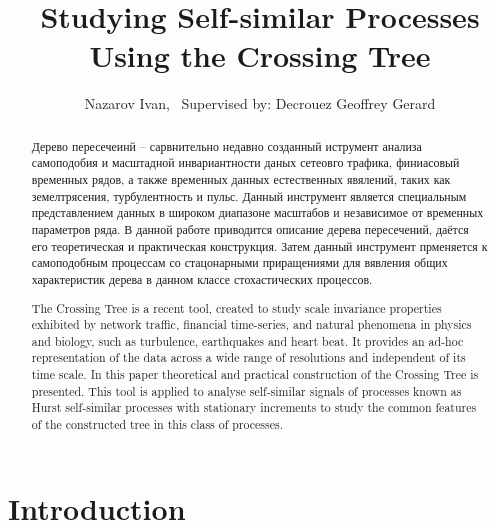 \documentclass[a4paper,14pt]{extreport}
\title{Studying Self-similar Processes Using the Crossing Tree}
\author{Nazarov Ivan, \rus{101мНОД(ИССА)}\
	{\small Supervised by: Decrouez Geoffrey Gerard}}
\begin{document}

\clearpage


\clearpage

\begin{abstract}
Дерево пересечеинй -- сарвнительно недавно созданный иструмент анализа самоподобия
и масштадной инвариантности даных сетеовго трафика, финиасовый временных рядов, а
также временных данных естественных явялений, таких как земелтрясения, турбулентность
и пульс. Данный инструмент является специальным представлением данных в широком
диапазоне масштабов и независимое от временных параметров ряда. В данной работе
приводится описание дерева пересечений, даётся его теоретическая и практическая
конструкция. Затем данный инструмент прменяется к самоподобным процессам со стацонарными
приращениями для вявления общих характеристик дерева в данном классе стохастических
процессов.
\end{abstract}

\begin{abstract}
The Crossing Tree is a recent tool, created to study scale invariance properties
exhibited by network traffic, financial time-series, and natural phenomena in physics
and biology, such as turbulence, earthquakes and heart beat. It provides an ad-hoc
representation of the data across a wide range of resolutions and independent of
its time scale. In this paper theoretical and practical construction of the Crossing
Tree is presented. This tool is applied to analyse self-similar signals of processes
known as Hurst self-similar processes with stationary increments to study the common
features of the constructed tree in this class of processes.
\end{abstract}

\tableofcontents
\clearpage
{}


\chapter*{Introduction} %
\label{cha:introduction}


\clearpage
 

\clearpage



\clearpage


% 




\end{document}
